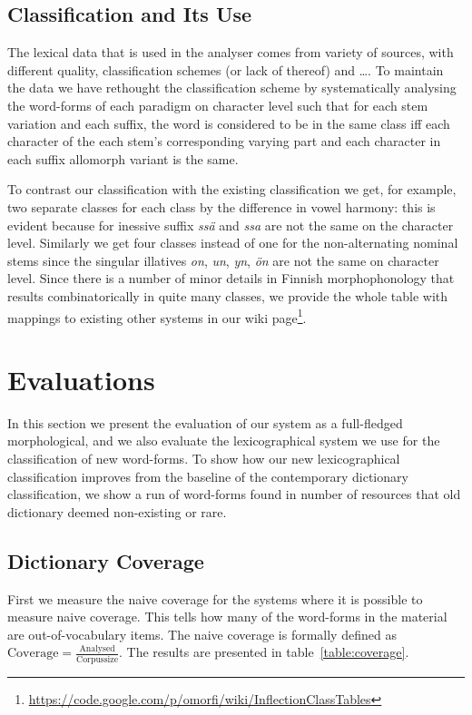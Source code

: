 \documentclass[a4paper,12pt]{article}
\begin{document}
\subsection{Classification and Its Use}

The lexical data that is used in the analyser comes from variety of sources,
with different quality, classification schemes (or lack of thereof) and \ldots.
To maintain the data we have rethought the classification scheme by
systematically analysing the word-forms of each paradigm on character level such
that for each stem variation and each suffix, the word is considered to be in
the same class iff each character of the each stem's corresponding varying part
and each character in each suffix allomorph variant is the same. 

To contrast our classification with the existing classification we get, for
example, two separate classes for each class by the difference in vowel
harmony: this is evident because for inessive suffix \emph{ssä} and \emph{ssa}
are not the same on the character level. Similarly we get four classes instead
of one for the non-alternating nominal stems since the singular illatives
\emph{on}, \emph{un}, \emph{yn}, \emph{ön} are not the same on character level.
Since there is a number of minor details in Finnish morphophonology that
results combinatorically in quite many classes, we provide the whole table with
mappings to existing other systems in our wiki
page\footnote{\url{https://code.google.com/p/omorfi/wiki/InflectionClassTables}}.



\section{Evaluations}

In this section we present the evaluation of our system as a full-fledged
morphological, and we also evaluate the lexicographical system we use for
the classification of new word-forms. To show how our new lexicographical
classification improves from the baseline of the contemporary dictionary
classification, we show a run of word-forms found in number of resources that
old dictionary deemed non-existing or rare.

\subsection{Dictionary Coverage}

First we measure the naive coverage for the systems where it is possible to
measure naive coverage. This tells how many of the word-forms in the material
are out-of-vocabulary items. The naive coverage is formally defined as
$\mathrm{Coverage} = \frac{\mathrm{Analysed}}{\mathrm{Corpus size}}$. The
results are presented in table~\ref{table:coverage}. 
\end{document}
